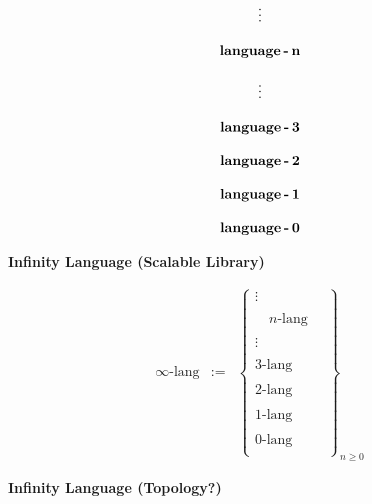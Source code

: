 \documentclass[twoside]{article}
\begin{document}
$$ \begin{array}{c}
				\\
\vdots				\\
				\\
\mbox{\bf language\,-\,n}	\\
				\\
\vdots				\\
				\\
\mbox{\bf language\,-\,3}	\\
				\\
\mbox{\bf language\,-\,2}	\\
				\\
\mbox{\bf language\,-\,1}	\\
				\\
\mbox{\bf language\,-\,0}	\\
\end{array} $$

\vspace{0.5cm}

\begin{center}
\bf Infinity Language (Scalable Library)
\end{center}

$$ \begin{array}{lcr}
\infty\mbox{-lang} & := & \left\{\begin{array}{c}
 \vdots								\\
								\\
\quad n\mbox{-lang} \quad					\\
								\\
 \vdots								\\
								\\
 3\mbox{-lang}							\\
								\\
 2\mbox{-lang}							\\
								\\
 1\mbox{-lang}							\\
								\\
 0\mbox{-lang}							\\
 \end{array}\right\}_{n\ge 0}
\end{array} $$

\vspace{0.5cm}

\begin{center}
\bf Infinity Language (Topology?)
\end{center}
\end{document}
